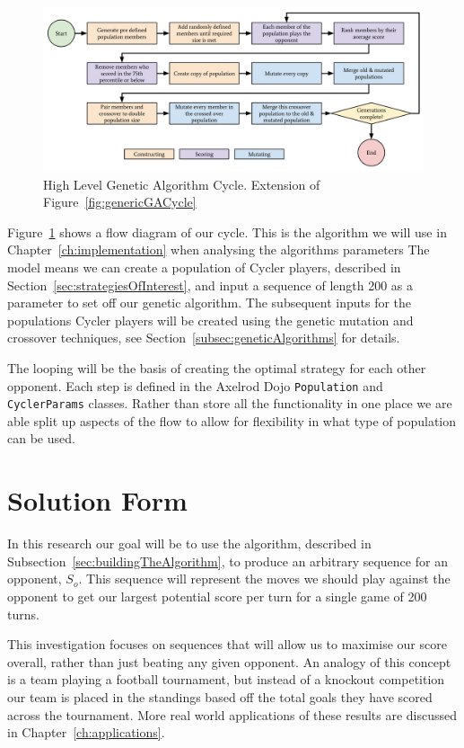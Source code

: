 \begin{figure}[ht]
    \includegraphics[width=1.0\textwidth, center]{./img/flows/custom_ga_cycle}
    \caption{High Level Genetic Algorithm Cycle. Extension of Figure~\ref{fig:genericGACycle}}\label{fig:customGAcycle}
\end{figure}

Figure~\ref{fig:customGAcycle} shows a flow diagram of our cycle.
This is the algorithm we will use in Chapter~\ref{ch:implementation} when analysing the algorithms parameters
The model means we can create a population of Cycler players, described in Section~\ref{sec:strategiesOfInterest}, and input a sequence of length 200 as a parameter to set off our genetic algorithm.
The subsequent inputs for the populations Cycler players will be created using the genetic mutation and crossover techniques, see Section~\ref{subsec:geneticAlgorithms} for details.

The looping will be the basis of creating the optimal strategy for each other opponent.
Each step is defined in the Axelrod Dojo \texttt{Population} and \texttt{CyclerParams} classes.
Rather than store all the functionality in one place we are able split up aspects of the flow to allow for flexibility in what type of population can be used.

\section{Solution Form}\label{sec:solutionForm}
In this research our goal will be to use the algorithm, described in Subsection~\ref{sec:buildingTheAlgorithm}, to produce an arbitrary sequence for an opponent, \(S_o\).
This sequence will represent the moves we should play against the opponent to get our largest potential score per turn for a single game of 200 turns.

This investigation focuses on sequences that will allow us to maximise our score overall, rather than just beating any given opponent.
An analogy of this concept is a team playing a football tournament, but instead of a knockout competition our team is placed in the standings based off the total goals they have scored across the tournament.
More real world applications of these results are discussed in Chapter~\ref{ch:applications}.

